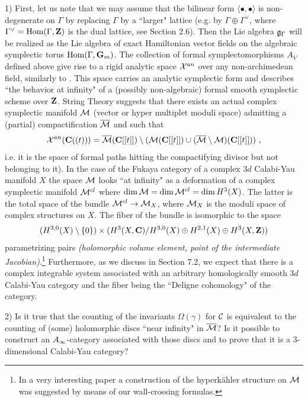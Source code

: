 \documentclass[12pt]{article}
\begin{document}
1) First, let us note that we may assume that the bilinear form $\langle \bullet,\bullet \rangle$ is non-degenerate on $\Gamma$
by replacing $\Gamma$ by a ``larger" lattice  (e.g. by $\Gamma\oplus \Gamma^{\vee}$, where $\Gamma^{\vee}=\operatorname{Hom}(\Gamma, {\bf Z})$ is the dual lattice, see Section 2.6). Then the Lie algebra ${\mathfrak g}_{\Gamma}$ will be realized as the Lie algebra of exact Hamiltonian vector fields on the algebraic symplectic torus $\operatorname{Hom}(\Gamma, {\bf G}_m)$. The collection of formal symplectomorphisms $A_V$ defined above give rise to a rigid analytic space ${\cal X}^{an}$ over any non-archimedean field, similarly to \cite{KoSo1}. This space carries an analytic symplectic form and describes ``the behavior at infinity" of a (possibly non-algebraic) formal smooth symplectic scheme over ${\bf Z}$. String Theory suggests that there exists an actual complex symplectic manifold ${\cal M}$ (vector or hyper multiplet moduli space) admitting a (partial) compactification
$\overline{\cal M}$ and such that 
$${\cal X}^{an}({\bf C}((t)))=\overline{\cal M}({\bf C}[[t]])\setminus ({\cal M}({\bf C}[[t]])\cup (\overline{\cal M}\setminus {\cal M})({\bf C}[[t]]))\,\,,$$
i.e. it is the space of formal paths hitting the compactifying divisor but not belonging to it).
In the case of the Fukaya category of a complex $3d$ Calabi-Yau manifold $X$ the space ${\cal M}$ looks ``at infinity" as a deformation of a complex symplectic manifold ${\cal M}^{cl}$ where $\dim  {\cal M}=\dim  {\cal M}^{cl}=\dim  H^3(X)$. The latter is the total space of the bundle ${\cal M}^{cl}\to {\cal M}_X$, where
${\cal M}_X$ is the moduli space of complex structures on $X$. The fiber of the bundle is isomorphic to the space 
$$(H^{3,0}(X)\setminus \{0\})\times (H^3(X,{\bf C})/H^{3,0}(X)\oplus H^{2,1}(X)\oplus H^3(X,{\bf Z}))$$
 parametrizing  pairs {\it (holomorphic volume element, point of the intermediate Jacobian)}.\footnote{In a very interesting paper \cite{GaMNeit} a construction of the hyperk\"ahler structure on ${\cal M}$ was suggested by means of our wall-crossing formulas.}
Furthermore, as we discuss in Section 7.2, we expect that there is a complex integrable system associated with an arbitrary homologically smooth $3d$ Calabi-Yau category and the fiber being the ``Deligne cohomology" of the category.


2) Is it true that the counting of the  invariants $\Omega(\gamma)$ for ${\cal C}$ is equivalent to the counting of (some) holomorphic discs ``near infinity" in $\overline{\cal M}$? Is it possible to construct an $A_{\infty}$-category associated with those discs and to prove
that it is a $3$-dimensional Calabi-Yau category?
\end{document}
